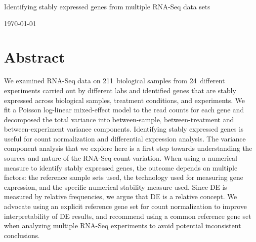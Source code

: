 \documentclass[letterpaper,12pt]{article}
\newcommand{\howmanySamples}{211~}
\newcommand{\howmanylab}{24~}
\begin{document}
%
%
%

\newpage

\begin{center}

{\Large Identifying stably expressed genes from multiple RNA-Seq data sets}

\today

\end{center}


\newpage
\section*{Abstract}
We examined RNA-Seq data on \howmanySamples biological samples from \howmanylab different
experiments carried out by different labs and identified genes that are stably
expressed across biological samples, treatment conditions, and experiments. We
fit a Poisson log-linear mixed-effect model to the read counts for each gene
and decomposed the total variance into between-sample, between-treatment and
between-experiment variance components. Identifying stably expressed genes is
useful for count normalization and differential expression analysis. The
variance component analysis that we explore here is a first step towards understanding the sources
and nature of the RNA-Seq count variation.
When using a numerical measure to identify stably expressed genes, the outcome
depends on multiple factors: the reference sample sets used, the technology
used for measuring gene expression, and the specific numerical stability
measure used.  Since DE is measured by relative frequencies, we argue that DE
is a relative concept. We advocate using an explicit reference gene set for
count normalization to improve interpretability of DE results, and recommend
using a common reference gene set when analyzing multiple RNA-Seq experiments
to avoid potential inconsistent conclusions.
\end{document}
